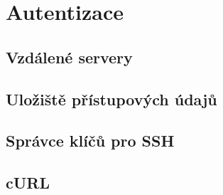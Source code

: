 \section{Autentizace}

\subsection{Vzdálené servery}


\subsection{Uložiště přístupových údajů}


\subsection{Správce klíčů pro SSH}


\subsection{cURL}

